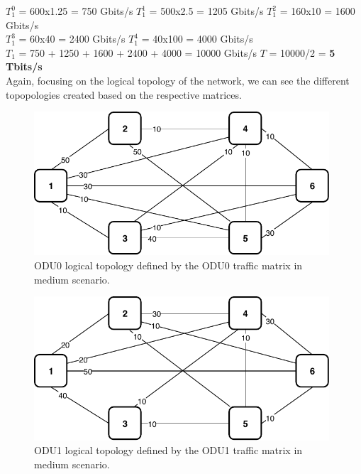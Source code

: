 $T_1^0$ = 600x1.25 = 750 Gbits/s \quad
$T_1^1$ = 500x2.5 = 1205 Gbits/s \quad
$T_1^2$ = 160x10 = 1600 Gbits/s \\

$T_1^3$ = 60x40 = 2400 Gbits/s \quad
$T_1^4$ = 40x100 = 4000 Gbits/s \\

$T_{1}$ = 750 + 1250 + 1600 + 2400 + 4000 = 10000 Gbits/s \qquad
$T$ = 10000/2 = \textbf{5 Tbits/s}\\

Again, focusing on the logical topology of the network, we can see the different topopologies created based on the respective matrices.\\

\begin{figure}[h!]
\centering
\includegraphics[width=11cm]{sdf/ilp/opaque_survivability/figures/logical_topology_ODU0_medium}
\caption{ODU0 logical topology defined by the ODU0 traffic matrix in medium scenario.}
\label{logical_ODU0_medium}
\end{figure}
\vspace{13pt}
\begin{figure}[h!]
\centering
\includegraphics[width=11cm]{sdf/ilp/opaque_survivability/figures/logical_topology_ODU1_medium}
\caption{ODU1 logical topology defined by the ODU1 traffic matrix in medium scenario.}
\label{logical_ODU1_medium}
\end{figure}
\newpage
